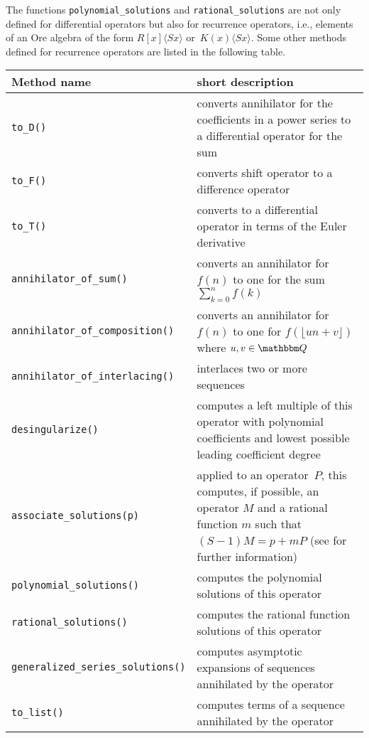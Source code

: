 \documentclass{llncs}
\let\set\mathbbm
\def\<#1>{\langle#1\rangle}
\begin{document}
The functions \verb|polynomial_solutions| and \verb|rational_solutions| are not
only defined for differential operators but also for recurrence operators, i.e.,
elements of an Ore algebra of the form $R[x]\<Sx>$ or~$K(x)\<Sx>$. Some other
methods defined for recurrence operators are listed in the following table. 

\begin{center}
  \begin{tabular}{|l|p{.55\hsize}|}
    \hline
    Method name & short description \\\hline
    \verb|to_D()| & converts annihilator for the coefficients in a power series to a
        differential operator for the sum \\
    \verb|to_F()| & converts shift operator to a difference operator\\
    \verb|to_T()| & converts to a differential operator in terms of the Euler derivative \\
    \verb|annihilator_of_sum()| & converts an annihilator for $f(n)$ to one for the sum $\sum_{k=0}^n f(k)$\\
    \verb|annihilator_of_composition()| & converts an annihilator for $f(n)$ to one for $f(\lfloor un+v \rfloor)$ where $u, v \in \set Q$ \\
    \verb|annihilator_of_interlacing()| & interlaces two or more sequences\\
    \verb|desingularize()| & computes a left multiple of this operator with polynomial coefficients and 
           lowest possible leading coefficient degree\\
    \verb|associate_solutions(p)| & applied to an operator~$P$, this computes, if possible, an operator $M$
    and a rational function $m$ such that $(S-1)M=p+mP$ (see \cite{abramov99} for further information)\\
    \verb|polynomial_solutions()| & computes the polynomial solutions of this operator\\
    \verb|rational_solutions()| & computes the rational function solutions of this operator\\
    \verb|generalized_series_solutions()| & computes asymptotic expansions of sequences annihilated by the operator\\ 
    \verb|to_list()| & computes terms of a sequence annihilated by the operator\\\hline
  \end{tabular}
\end{center}

\smallskip
\end{document}
